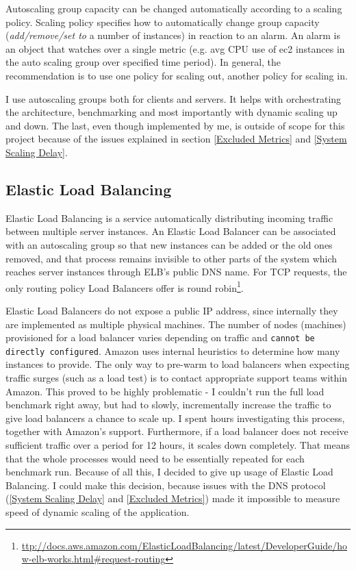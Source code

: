 \documentclass{uvamscse}
\begin{document}
Autoscaling group capacity can be changed automatically according to a scaling policy. Scaling policy specifies how to automatically change group capacity (\textit{add/remove/set to} a number of instances) in reaction to an alarm. An alarm is an object that watches over a single metric (e.g. avg CPU use of ec2 instances in the auto scaling group over specified time period). In general, the recommendation is to use one policy for scaling out, another policy for scaling in.

I use autoscaling groups both for clients and servers. It helps with orchestrating the architecture, benchmarking and most importantly with dynamic scaling up and down. The last, even though implemented by me, is outside of scope for this project because of the issues explained in section \ref{Excluded Metrics} and \ref{System Scaling Delay}.

\subsection{Elastic Load Balancing}\label{Load balancing}
Elastic Load Balancing is a service automatically distributing incoming traffic between multiple server instances. An Elastic Load Balancer can be associated with an autoscaling group so that new instances can be added or the old ones removed, and that process remains invisible to other parts of the system which reaches server instances through ELB's public DNS name. For TCP requests, the only routing policy Load Balancers offer is round robin\footnote{\url{ttp://docs.aws.amazon.com/ElasticLoadBalancing/latest/DeveloperGuide/how-elb-works.html\#request-routing}}.

Elastic Load Balancers do not expose a public IP address, since internally they are implemented as multiple physical machines. The number of nodes (machines) provisioned for a load balancer varies depending on traffic and \texttt{cannot be directly configured}. Amazon uses internal heuristics to determine how many instances to provide. The only way to pre-warm to load balancers when expecting traffic surges (such as a load test) is to contact appropriate support teams within Amazon. This proved to be highly problematic - I couldn't run the full load benchmark right away, but had to slowly, incrementally increase the traffic to give load balancers a chance to scale up. I spent hours investigating this process, together with Amazon's support. Furthermore, if a load balancer does not receive sufficient traffic over a period for 12 hours, it scales down completely. That means that the whole processes would need to be essentially repeated for each benchmark run. Because of all this, I decided to give up usage of Elastic Load Balancing. I could make this decision, because issues with the DNS protocol (\ref{System Scaling Delay} and \ref{Excluded Metrics}) made it impossible to measure speed of dynamic scaling of the application.
\end{document}

